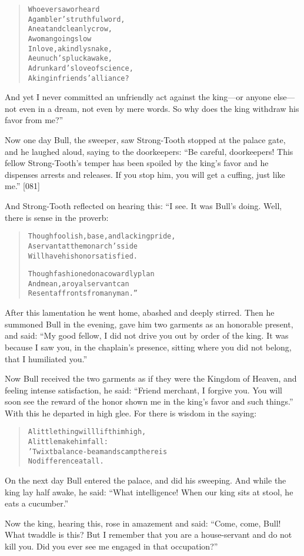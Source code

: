 \documentclass[article, twoside, 14pt]{memoir}
\renewenvironment{verbatim}{%
\begin{quote}%
\vskip -10pt%
\begin{alltt}\normalfont\large}{\end{alltt}%
\end{quote}%
\vskip -10pt
} %
\begin{document}
\begin{verbatim}
Who ever saw or heard
A gambler's truthful word,
A neat and cleanly crow,
A woman going slow
In love, a kindly snake,
A eunuch's pluck awake,
A drunkard's love of science,
A king in friends' alliance?
\end{verbatim}
And yet I never committed an unfriendly act against the king---or
anyone else---not even in a dream, not even by mere words. So why
does the king withdraw his favor from me?”

Now one day Bull, the sweeper, saw Strong-Tooth stopped at the
palace gate, and he laughed aloud, saying to the doorkeepers:
``Be careful, doorkeepers! This fellow Strong-Tooth's temper has been spoiled by the king's favor and he dispenses arrests and releases. If you stop him, you will get a cuffing, just like me.''
[081]

And Strong-Tooth reflected on hearing this: “I see. It was Bull's
doing. Well, there is sense in the proverb:

\begin{verbatim}
Though foolish, base, and lacking pride,
A servant at the monarch's side
Will have his honor satisfied.

Though fashioned on a cowardly plan
And mean, a royal servant can
Resent affronts from any man.”
\end{verbatim}
After this lamentation he went home, abashed and deeply stirred.
Then he summoned Bull in the evening, gave him two garments as an
honorable present, and said:
``My good fellow, I did not drive you out by order of the king. It was because I saw you, in the chaplain's presence, sitting where you did not belong, that I humiliated you.''

Now Bull received the two garments as if they were the Kingdom of
Heaven, and feeling intense satisfaction, he said:
``Friend merchant, I forgive you. You will soon see the reward of the honor shown me in the king's favor and such things.''
With this he departed in high glee. For there is wisdom in the
saying:

\begin{verbatim}
A little thing will lift him high,
    A little make him fall:
'Twixt balance-beam and scamp there is
    No difference at all.
\end{verbatim}
On the next day Bull entered the palace, and did his sweeping. And
while the king lay half awake, he said:
``What intelligence! When our king sits at stool, he eats a cucumber.''

Now the king, hearing this, rose in amazement and said:
``Come, come, Bull! What twaddle is this? But I remember that you are a house-servant and do not kill you. Did you ever see me engaged in that occupation?''
\end{document}
